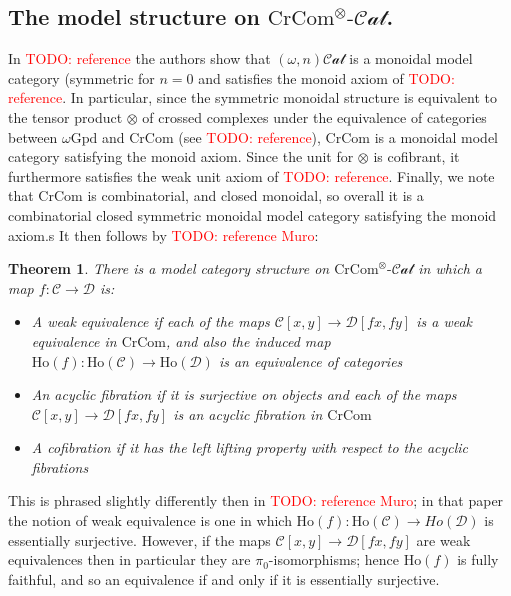 \documentclass[12pt]{article}
\newtheorem{theorem}{Theorem}[section]
\theoremstyle{definition}
\newcommand{\TODO}[1]{\textcolor{red}{TODO: {#1}}}
\newcommand{\C}{\mathcal{C}}
\newcommand{\D}{\mathcal{D}}
\newcommand{\stinfty}{\omega\text{Gpd}}
\newcommand{\crcom}{\text{CrCom}}
\newcommand{\omegancat}[1]{(\omega,#1)\mathcal{Cat}}
\newcommand{\tensorcrossedcat}{\crcom^\otimes\text{-}\mathcal{Cat}}
\newcommand{\Ho}{\text{Ho}}
\begin{document}
\subsection{The model structure on $\tensorcrossedcat$.}
	In \TODO{reference} the authors show that $\omegancat{n}$ is a monoidal model category (symmetric for $n = 0$ and satisfies the monoid axiom of \TODO{reference}. In particular, since the symmetric monoidal structure is equivalent to the tensor product $\otimes$ of crossed complexes under the equivalence of categories between $\stinfty$ and $\crcom$ (see \TODO{reference}), $\crcom$ is a monoidal model category satisfying the monoid axiom. 
	Since the unit for $\otimes$ is cofibrant, it furthermore satisfies the weak unit axiom of \TODO{reference}.
	Finally, we note that $\crcom$ is combinatorial, and closed monoidal, 
	so overall it is a combinatorial closed symmetric monoidal model category satisfying the monoid axiom.s
	It then follows by \TODO{reference Muro}:
	\begin{theorem}
		There is a model category structure on $\tensorcrossedcat$ in which a map $f: \C \to \D$ is:
		\begin{itemize}
			\item A weak equivalence if each of the maps $\C[x,y] \to \D[fx,fy]$ is a weak equivalence in $\crcom$, and also the induced map $\Ho(f): \Ho(\C) \to \Ho(\D)$ is an equivalence of categories
			\item An acyclic fibration if it is surjective on objects and each of the maps $\C[x,y] \to \D[fx,fy]$ is an acyclic fibration in $\crcom$
			\item A cofibration if it has the left lifting property with respect to the acyclic fibrations
		\end{itemize}
	\end{theorem}
	This is phrased slightly differently then in \TODO{reference Muro}; in that paper the notion of weak equivalence is one in which $\Ho(f) : \Ho(\C) \to Ho(\D)$ is essentially surjective. 
	However, if the maps $\C[x,y] \to \D[fx,fy]$ are weak equivalences then in particular they are $\pi_0$-isomorphisms; hence $\Ho(f)$ is fully faithful, and so an equivalence if and only if it is essentially surjective.
\end{document}

